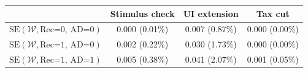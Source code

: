 \begin{tabular}{@{}lccc@{}}
\toprule
                          & Stimulus check      & UI extension    & Tax cut    \\  \midrule
$\mathrm{SE}(\mathcal{W}, \text{Rec=0, AD=0})$ & 0.000 (0.01\%)  & 0.007 (0.87\%)  & 0.000 (0.00\%)     \\
$\mathrm{SE}(\mathcal{W}, \text{Rec=1, AD=0})$ & 0.002 (0.22\%)  & 0.030 (1.73\%)  & 0.000 (0.00\%)     \\
$\mathrm{SE}(\mathcal{W}, \text{Rec=1, AD=1})$ & 0.005 (0.38\%)  & 0.041 (2.07\%)  & 0.001 (0.05\%)     \\ \bottomrule
\end{tabular}
